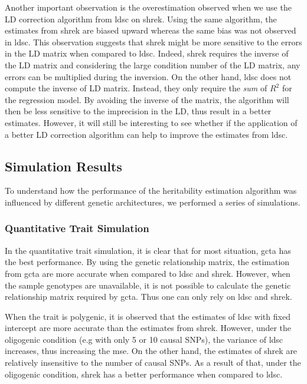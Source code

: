 	Another important observation is the overestimation observed when we use the \gls{LD} correction algorithm from \gls{ldsc} on \gls{shrek}. 
	Using the same algorithm, the estimates from \gls{shrek} are biased upward whereas the same bias was not observed in \gls{ldsc}.
	This observation suggests that \gls{shrek} might be more sensitive to the errors in the \gls{LD} matrix when compared to \gls{ldsc}.
	Indeed, \gls{shrek} requires the inverse of the \gls{LD} matrix and considering the large condition number of the \gls{LD} matrix, any errors can be multiplied during the inversion.
	On the other hand, \gls{ldsc} does not compute the inverse of \gls{LD} matrix.
	Instead, they only require the \emph{sum} of $R^2$ for the regression model.
	By avoiding the inverse of the matrix, the algorithm will then be less sensitive to the imprecision in the \gls{LD}, thus result in a better estimates.
	However, it will still be interesting to see whether if the application of a better \gls{LD} correction algorithm can help to improve the estimates from \gls{ldsc}.
	

	\subsection{Simulation Results}
	To understand how the performance of the heritability estimation algorithm was influenced by different genetic architectures, we performed a series of simulations.
	
	\subsubsection{Quantitative Trait Simulation}
	In the quantitative trait simulation, it is clear that for most situation, \gls{gcta} has the best performance.
	By using the genetic relationship matrix, the estimation from \gls{gcta} are more accurate when compared to \gls{ldsc} and \gls{shrek}.
	However, when the sample genotypes are unavailable, it is not possible to calculate the genetic relationship matrix required by \gls{gcta}. 
	Thus one can only rely on \gls{ldsc} and \gls{shrek}.
	
	When the trait is polygenic, it is observed that the estimates of \gls{ldsc} with fixed intercept are more accurate than the estimates from \gls{shrek}. 
	However, under the oligogenic condition (e.g with only 5 or 10 causal \glspl{SNP}), the variance of \gls{ldsc} increases, thus increasing the \gls{mse}.
	On the other hand, the estimates of \gls{shrek} are relatively insensitive to the number of causal \glspl{SNP}.
	As a result of that, under the oligogenic condition, \gls{shrek} has a better performance when compared to \gls{ldsc}.
	
